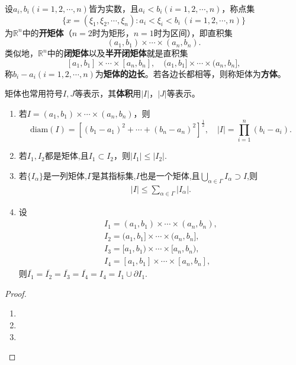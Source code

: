 \documentclass[../../main.tex]{subfiles}%
\begin{document}
\begin{definition}[矩体]
设\(a_i,b_i(i = 1,2,\cdots,n)\)皆为实数，且\(a_i < b_i(i = 1,2,\cdots,n)\)，称点集
\[\{x = (\xi_1,\xi_2,\cdots,\xi_n):a_i<\xi_i < b_i\ (i = 1,2,\cdots,n)\}\]
为\(\mathbb{R}^n\)中的\textbf{开矩体}（\(n = 2\)时为矩形，\(n = 1\)时为区间），即直积集
\[(a_1,b_1)\times\cdots\times(a_n,b_n).\]
类似地，\(\mathbb{R}^n\)中的\textbf{闭矩体}以及\textbf{半开闭矩体}就是直积集
\[[a_1,b_1]\times\cdots\times[a_n,b_n],\quad(a_1,b_1]\times\cdots\times(a_n,b_n],\]
称\(b_i - a_i(i = 1,2,\cdots,n)\)为\textbf{矩体的边长}。若各边长都相等，则称矩体为\textbf{方体}。

矩体也常用符号\(I,J\)等表示，其\textbf{体积}用\(|I|\)，\(|J|\)等表示。
\end{definition}

\begin{proposition}[矩体的性质]\label{proposition:矩体的性质}
\begin{enumerate}[(1)]
\item 若\(I=(a_1,b_1)\times\cdots\times(a_n,b_n)\)，则
\[\text{diam}(I)=[(b_1 - a_1)^2+\cdots+(b_n - a_n)^2]^{\frac{1}{2}},\quad |I|=\prod_{i = 1}^{n}(b_i - a_i).\]

\item 若\(I_1,I_2\)都是矩体,且$I_1\subset I_2$，则$|I_1|\leqslant |I_2|$.

\item 若$\{I_\alpha\}$是一列矩体,$\Gamma$是其指标集,$I$也是一个矩体,且$\bigcup_{\alpha\in \Gamma}I_\alpha \supset I$,则
\begin{align*}
|I|\leqslant \sum_{\alpha\in \Gamma}|I_\alpha|.
\end{align*}

\item 设
\begin{gather*}
I_1=(a_1,b_1)\times \cdots \times (a_n,b_n),
\\
I_2=(a_1,b_1]\times \cdots \times (a_n,b_n],
\\
I_3=[a_1,b_1)\times \cdots \times [a_n,b_n),
\\
I_4=[a_1,b_1]\times \cdots \times [a_n,b_n],
\end{gather*}
则$\overline{I_1}=\overline{I_2}=\overline{I_3}=\overline{I_4}=I_4=I_1\cup \partial I_1$.
\end{enumerate}
\end{proposition}
\begin{proof}
\begin{enumerate}[(1)]
\item 

\item 

\item 
\end{enumerate}
\end{proof}
\end{document}
